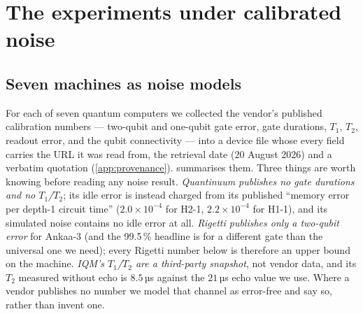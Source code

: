 \section{The experiments under calibrated noise}
\label{sec:noise}

\subsection{Seven machines as noise models}
\label{sec:devices}

For each of seven quantum computers we collected the vendor's published calibration numbers
--- two-qubit and one-qubit gate error, gate durations, $T_1$, $T_2$, readout error, and the
qubit connectivity --- into a device file whose every field carries the URL it was read from,
the retrieval date (20 August 2026) and a verbatim quotation (\cref{app:provenance}).
 summarises them.  Three things are worth knowing before reading any noise
result.  \emph{Quantinuum publishes no gate durations and no $T_1$/$T_2$}; its idle error is
instead charged from its published ``memory error per depth-1 circuit time''
($2.0\times10^{-4}$ for H2-1, $2.2\times10^{-4}$ for H1-1), and its simulated noise contains
no idle error at all.  \emph{Rigetti publishes only a two-qubit error} for Ankaa-3 (and the
99.5\,\% headline is for a different gate than the universal one we need); every Rigetti number
below is therefore an upper bound on the machine.  \emph{IQM's $T_1$/$T_2$ are a third-party
snapshot}, not vendor data, and its $T_2$ measured without echo is $8.5$\,µs against the
$21$\,µs echo value we use.  Where a vendor publishes no number we model that channel as
error-free and say so, rather than invent one.

